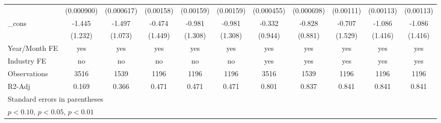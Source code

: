 \begin{table}[htbp]
\begin{tabular}{l*{10}{c}}
                &(0.000900)         &(0.000617)         &(0.00158)         &(0.00159)         &(0.00159)         &(0.000455)         &(0.000698)         &(0.00111)         &(0.00113)         &(0.00113)         \\
\_cons          &   -1.445         &   -1.497         &   -0.474         &   -0.981         &   -0.981         &   -0.332         &   -0.828         &   -0.707         &   -1.086         &   -1.086         \\
                &  (1.232)         &  (1.073)         &  (1.449)         &  (1.308)         &  (1.308)         &  (0.944)         &  (0.881)         &  (1.529)         &  (1.416)         &  (1.416)         \\
\hline
Year/Month FE   &      yes         &      yes         &      yes         &      yes         &      yes         &      yes         &      yes         &      yes         &      yes         &      yes         \\
Industry FE     &       no         &       no         &       no         &       no         &       no         &      yes         &      yes         &      yes         &      yes         &      yes         \\
Observations    &     3516         &     1539         &     1196         &     1196         &     1196         &     3516         &     1539         &     1196         &     1196         &     1196         \\
R2-Adj          &    0.169         &    0.366         &    0.471         &    0.471         &    0.471         &    0.801         &    0.837         &    0.841         &    0.841         &    0.841         \\
\hline\hline
\multicolumn{11}{l}{\footnotesize Standard errors in parentheses}\\
\multicolumn{11}{l}{\footnotesize \sym{*} \(p<0.10\), \sym{**} \(p<0.05\), \sym{***} \(p<0.01\)}\\
\end{tabular}
\end{table}
